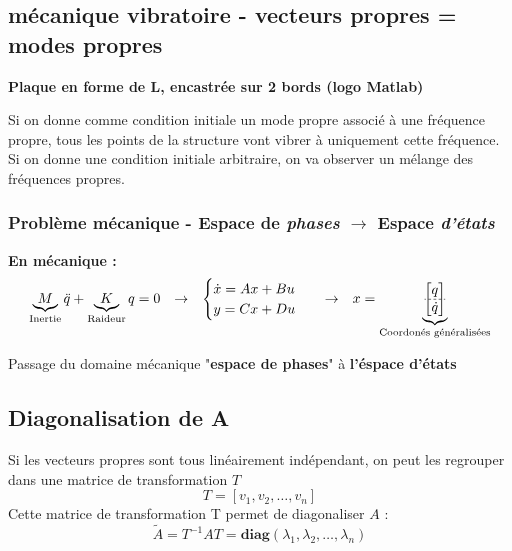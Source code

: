 \documentclass[document.tex]{subfiles}
\begin{document}

\subsection{mécanique vibratoire - vecteurs propres = modes propres}

\textbf{Plaque en forme de L, encastrée sur 2 bords (logo Matlab)}

Si on donne comme condition initiale un mode propre associé à une fréquence propre, tous les points de la structure vont vibrer à uniquement cette fréquence.\\ 
Si on donne une condition initiale arbitraire, on va observer un mélange des fréquences propres.\\

\subsubsection{Problème mécanique - Espace de \textit{phases} $\rightarrow$ Espace \textit{d'états}}

\textbf{En mécanique :}
\begin{equation}
\begin{array}{c c l c l}
	\underbrace{M}_{\text{Inertie}} \ddot{q} + \underbrace{K}_{\text{Raideur}} q = 0 & \rightarrow & \begin{cases} \dot{x} = A x + B u \\  y = C x + D u \end{cases} & \rightarrow & x = \underbrace{\begin{bmatrix}
	q \\ \hdashline[2pt/1pt] \dot{q} \end{bmatrix}}_{\text{Coordonés généralisées}}
\end{array}
\end{equation}

Passage du domaine mécanique "\textbf{espace de phases}" à \textbf{l'éspace d'états}

\subsection{Diagonalisation de A}
Si les vecteurs propres sont tous linéairement indépendant, on peut les regrouper dans une matrice de transformation $T$
\begin{equation}
T = [v_1, v_2, \ldots, v_n]
\end{equation}
Cette matrice de transformation T permet de diagonaliser $A$ :\\
\begin{equation}
	\tilde{A}=T^{-1}AT = \textbf{diag}(\lambda_1,\lambda_2,\ldots,\lambda_n)
\end{equation}
\end{document}
